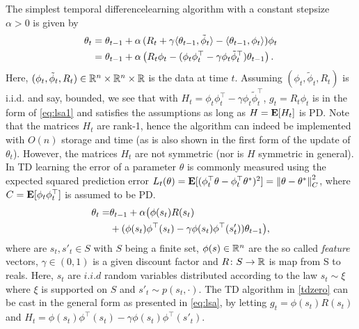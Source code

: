 \begin{example}
The simplest temporal differencelearning algorithm with a constant stepsize $\alpha>0$ is given by
\begin{align}
\label{tdzero}
\begin{split}
\theta_t
& = \theta_{t-1}+\alpha\, (R_t+ \gamma \langle\theta_{t-1},\tilde{\phi}_t \rangle - \langle\theta_{t-1},\phi_t\rangle)\phi_t \\
& = \theta_{t-1}+\alpha\, \bigl( R_t\phi_t- (\phi_t \phi_t^\top-\gamma \phi_t \tilde{\phi}_t^\top)\theta_{t-1}\bigr)\,.
\end{split}
\end{align}
Here, $(\phi_t,\tilde{\phi}_t,R_t)\in \mathbb{R}^n\times \mathbb{R}^n \times \mathbb{R}$ is the data at time $t$.
Assuming $(\phi_t,\tilde{\phi}_t,R_t)$ is i.i.d. and say, bounded, 
we see that with $H_t = \phi_t \phi_t^\top-\gamma \phi_t \tilde{\phi}_t^\top$, $g_t = R_t \phi_t$ is in the form of 
\eqref{eq:lsa1} and satisfies the assumptions as long as $H = \mathbf{E}[H_t]$ is PD. 
Note that the matrices $H_t$ are rank-1, hence the algorithm can indeed be implemented with $O(n)$ storage and
time (as is also shown in the first form of the update of $\theta_t$).
However, the matrices $H_t$ are not symmetric (nor is $H$ symmetric in general).
In TD learning the error of a parameter $\theta$ is commonly measured using the expected squared 
prediction error $L_t(\theta) = \mathbf{E}[ (\phi_t^\top \theta - \phi_t^\top \theta^*)^2 ] = \left\| \theta - \theta^*\right\|_C^2$,
where $C = \mathbf{E}[ \phi_t \phi_t^\top ]$ is assumed to be PD.
\begin{align}\label{tdzero}
\theta_t=&\theta_{t-1}+\alpha \big(\phi(s_t) R(s_t)\nonumber\\&+ (\phi(s_t)\phi^\top(s_t)-\gamma \phi(s_t)\phi^\top(s'_t))\theta_{t-1}\big),
\end{align}
where are $s_t,s'_t\in S$ with $S$ being a finite set, $\phi(s)\in \mathbb{R}^n$ are the so called \emph{feature} vectors, $\gamma\in (0,1)$ is a given discount factor and $R\colon S\rightarrow \mathbb{R}$ is map from S to reals. 
Here, $s_t$ are $i.i.d$ random variables distributed according to the law $s_t\sim \xi$ where $\xi$ is supported on $S$ and $s'_t\sim p(s_t,\cdot)$. The TD algorithm in \eqref{tdzero} can be cast in the general form as presented in \eqref{eq:lsa}, by letting $g_t=\phi(s_t)R(s_t)$ and $H_t=\phi(s_t)\phi^\top(s_t)-\gamma \phi(s_t)\phi^\top(s'_t)$.
\fi
\end{example}
